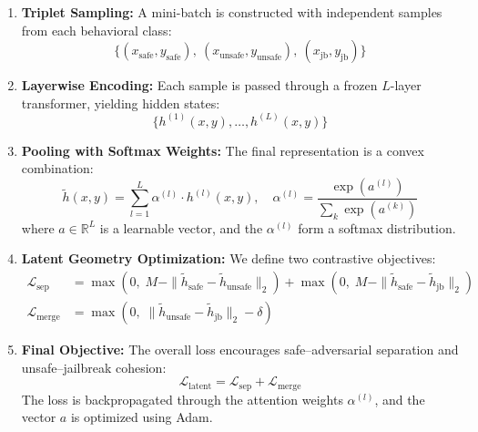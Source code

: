 \begin{enumerate}[leftmargin=1.5em, nosep]
    \item \textbf{Triplet Sampling:} A mini-batch is constructed with independent samples from each behavioral class:
    \[
    \{(x_{\text{safe}}, y_{\text{safe}}),\ (x_{\text{unsafe}}, y_{\text{unsafe}}),\ (x_{\text{jb}}, y_{\text{jb}})\}
    \]

    \item \textbf{Layerwise Encoding:} Each sample is passed through a frozen \(L\)-layer transformer, yielding hidden states:
    \[
    \{h^{(1)}(x, y), \ldots, h^{(L)}(x, y)\}
    \]

    \item \textbf{Pooling with Softmax Weights:} The final representation is a convex combination:
    \[
    \tilde{h}(x, y) = \sum_{l=1}^{L} \alpha^{(l)} \cdot h^{(l)}(x, y), \quad \alpha^{(l)} = \frac{\exp(a^{(l)})}{\sum_{k} \exp(a^{(k)})}
    \]
    where \(a \in \mathbb{R}^L\) is a learnable vector, and the \(\alpha^{(l)}\) form a softmax distribution.

    \item \textbf{Latent Geometry Optimization:} We define two contrastive objectives:
    \begin{align*}
    \mathcal{L}_{\mathrm{sep}} &= \max(0,\; M - \|\tilde{h}_{\text{safe}} - \tilde{h}_{\text{unsafe}}\|_2) 
    + \max(0,\; M - \|\tilde{h}_{\text{safe}} - \tilde{h}_{\text{jb}}\|_2) \\
    \mathcal{L}_{\mathrm{merge}} &= \max(0,\; \|\tilde{h}_{\text{unsafe}} - \tilde{h}_{\text{jb}}\|_2 - \delta)
    \end{align*}

    \item \textbf{Final Objective:} The overall loss encourages safe–adversarial separation and unsafe–jailbreak cohesion:
    \[
    \mathcal{L}_{\text{latent}} = \mathcal{L}_{\mathrm{sep}} + \mathcal{L}_{\mathrm{merge}}
    \]
    The loss is backpropagated through the attention weights \(\alpha^{(l)}\), and the vector \(a\) is optimized using Adam.
\end{enumerate}



